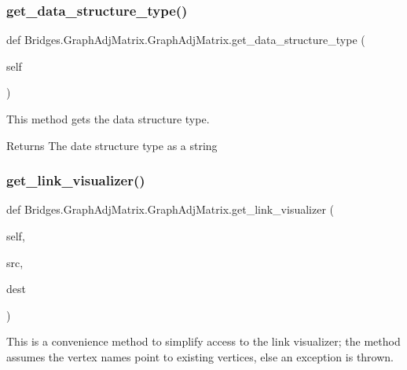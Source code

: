 \subsubsection{\texorpdfstring{get\+\_\+data\+\_\+structure\+\_\+type()}{get\_data\_structure\_type()}}
{\footnotesize\ttfamily def Bridges.\+Graph\+Adj\+Matrix.\+Graph\+Adj\+Matrix.\+get\+\_\+data\+\_\+structure\+\_\+type (\begin{DoxyParamCaption}\item[{}]{self }\end{DoxyParamCaption})}



This method gets the data structure type. 

\begin{DoxyReturn}{Returns}
The date structure type as a string 
\end{DoxyReturn}
\mbox{\label{class_bridges_1_1_graph_adj_matrix_1_1_graph_adj_matrix_acb341596f544ead8a39d00ec778b4a1b}} 
\subsubsection{\texorpdfstring{get\+\_\+link\+\_\+visualizer()}{get\_link\_visualizer()}}
{\footnotesize\ttfamily def Bridges.\+Graph\+Adj\+Matrix.\+Graph\+Adj\+Matrix.\+get\+\_\+link\+\_\+visualizer (\begin{DoxyParamCaption}\item[{}]{self,  }\item[{}]{src,  }\item[{}]{dest }\end{DoxyParamCaption})}



This is a convenience method to simplify access to the link visualizer; the method assumes the vertex names point to existing vertices, else an exception is thrown. 

\mbox{\label{class_bridges_1_1_graph_adj_matrix_1_1_graph_adj_matrix_a0bebc872619b97d2d1a1083511bfd62b}} 
